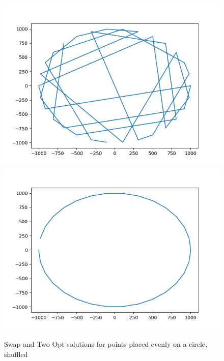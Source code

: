 \documentclass[12pt]{article}
\begin{document}
\begin{figure}
\includegraphics[scale=0.5]{CircleSwap.png}
\includegraphics[scale=0.5]{CircleTwoOpt.png}
\caption{Swap and Two-Opt solutions for points placed evenly on a circle, shuffled}
\end{figure}
\end{document}
